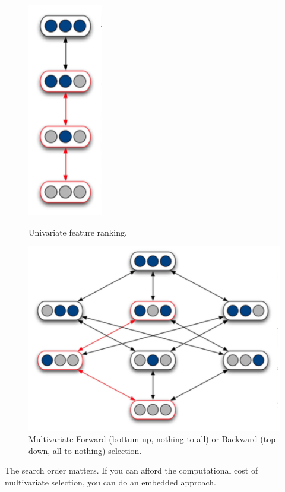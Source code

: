 \begin{figure}[H]
\centering
\begin{minipage}{.5\textwidth}
  \centering
  \includegraphics[scale=0.5]{images/65_uni.png}
  \caption{Univariate feature ranking.}
\end{minipage}%
\begin{minipage}{.5\textwidth}
  \centering
  \includegraphics[scale=0.5]{images/66_multi.png}
  \caption{Multivariate Forward (bottum-up, nothing to all) or Backward (top-down, all to nothing) selection.}
\end{minipage}
\end{figure}

The search order matters. If you can afford the computational cost of multivariate selection, you can do an embedded approach.


